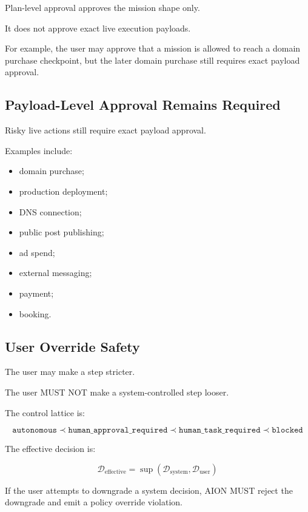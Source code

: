 Plan-level approval approves the mission shape only.

It does not approve exact live execution payloads.

For example, the user may approve that a mission is allowed to reach a domain purchase checkpoint, but the later domain purchase still requires exact payload approval.

\subsection{Payload-Level Approval Remains Required}

Risky live actions still require exact payload approval.

Examples include:

\begin{itemize}
  \item domain purchase;
  \item production deployment;
  \item DNS connection;
  \item public post publishing;
  \item ad spend;
  \item external messaging;
  \item payment;
  \item booking.
\end{itemize}

\subsection{User Override Safety}

The user may make a step stricter.

The user MUST NOT make a system-controlled step looser.

The control lattice is:

\begin{equation}
\mathtt{autonomous}
\prec
\mathtt{human\_approval\_required}
\prec
\mathtt{human\_task\_required}
\prec
\mathtt{blocked}
\end{equation}

The effective decision is:

\begin{equation}
\mathcal{D}_{\mathrm{effective}}
=
\sup
(
\mathcal{D}_{\mathrm{system}},
\mathcal{D}_{\mathrm{user}}
)
\end{equation}

If the user attempts to downgrade a system decision, AION MUST reject the downgrade and emit a policy override violation.

